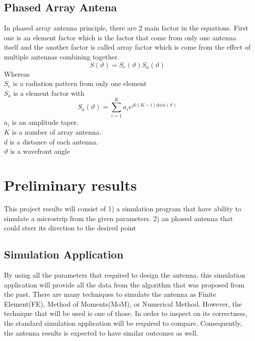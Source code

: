 \documentclass[11pt,a4paper,hidelinks]{article}
\begin{document}
  \newpage

    \subsection{Phased Array Antena}
      In phased array antenna principle, there are 2 main factor in the equations. First one is an element factor which is the factor that come from only one antenna itself and the another factor is called array factor which is come from the effect of multiple antennas combining together.
      \begin{equation} 
        S(\vartheta)=S_{e}(\vartheta)S_a(\vartheta)  \label{ii}
      \end{equation}
        Whereas \\[1ex]
        \indent $S_{e}$ is a radiation pattern from only one element\\
        \indent $S_{a}$ is a element factor with
        \begin{equation} 
          S_{a}(\vartheta) = \sum\limits_{i=1}^K a_{i}e^{jk(K-i)dsin(\vartheta)}
        \end{equation}
        \indent $a_{i}$ is an amplitude taper.\\
        \indent $K$ is a number of array antenna.\\
        \indent $d$ is a distance of each antenna.\\
        \indent $\vartheta$ is a wavefront angle

  \newpage

  \section{Preliminary results}
    \indent This project results will consist of
    1) a simulation program that have ability  to simulate a microstrip from the given parameters.
    2) an phased antenna that could steer its direction to the desired point 
    
    \subsection{Simulation Application}
      \indent By using all the parameters that required to design the antenna, this simulation application will provide
              all the data from the algorithm that was proposed from the past. There are many techniques to simulate the antenna
              as Finite Element(FE), Method of Moments(MoM), or Numerical Method. However, the technique that will be used is one
              of those. In order to inspect on its correctness, the standard simulation application will be required to 
              compare. Consequently, the antenna results is expected to have similar outcomes as well.
    
\end{document}
